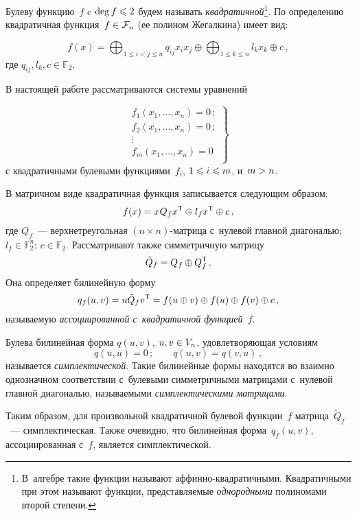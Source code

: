 \begin{multicols}{2}
Булеву функцию~$f$ c $\deg f\hm\leqslant 2$ будем называть 
\textit{квадратичной}\footnote{В~алгебре такие функции называют 
аффинно-квад\-ра\-тич\-ны\-ми. Квадратичными при этом называют функции, представляемые 
\textit{однородными} полиномами второй степени.}.
По определению квадратичная функция~$f\hm\in\mathcal{F}_n$ (ее полином Жегалкина) 
имеет вид:

\noindent
$$
f(x)= \bigoplus_{1\leqslant i<j\leqslant n} q_{ij}x_ix_j\oplus
\bigoplus_{1\leqslant k\leqslant n} 
l_kx_k \oplus c\,,
$$
где $q_{ij},l_k,c\in\mathbb{F}_2$.

В настоящей работе рассматриваются системы уравнений

\noindent
\begin{equation}
\left.
\begin{array}{c}
        f_1(x_1,\ldots,x_n)=0\,;\\
        f_2(x_1,\ldots,x_n)=0\,;\\
        \vdots\\
        f_m(x_1,\ldots,x_n)=0\\
    \end{array}
    \right\}
    \label{system}
\end{equation}
с квадратичными булевыми функциями~$f_i$, $1\hm\leqslant i\hm\leqslant m$, и~$m\hm>n$.

\pagebreak

В матричном виде квадратичная функция записывается следующим образом:
$$
f(x)=x Q_f x^{\mathsf T}\oplus l_f x^{\mathsf T} \oplus c\,,
$$
где $Q_f$~--- верхнетреугольная $(n\times n)$-мат\-ри\-ца с~нулевой главной 
диагональю; $l_f\in\mathbb{F}_2^n$; $c\in\mathbb{F}_2$.
Рас\-смат\-ри\-ва\-ют также симметричную матрицу
$$
\tilde{Q}_f=Q_f\oplus Q_f^{\mathsf T}\,.
$$
Она определяет билинейную форму
$$
q_f(u,v)=u\tilde{Q}_f v^{\mathsf T}=f(u\oplus v)\oplus f(u) \oplus f(v)\oplus c\,,
$$
называемую \textit{ассоциированной с~квадратичной функцией~$f$}.

Булева билинейная форма $q(u,v)$, $u,v\hm\in V_n$, удовле\-тво\-ря\-ющая условиям
$$
q(u,u)=0\,;\qquad q(u,v)=q(v,u)\,,
$$
называется \textit{симплектической}.
Такие билинейные формы находятся во взаимно однозначном соответствии с~булевыми 
симметричными матрицами с~нулевой главной диагональю, называемыми 
\textit{симплектическими матрицами}.

Таким образом, для произвольной квадратичной булевой функции~$f$ 
матрица~$\tilde{Q}_f$~--- сим\-плектическая. Также очевидно, что билинейная\linebreak 
форма~$q_f(u,v)$, ассоциированная с~$f$, является симплектической.


\end{multicols}
